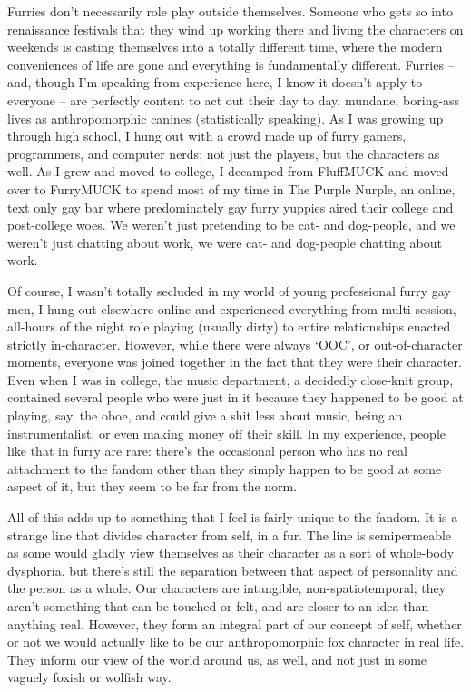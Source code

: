 Furries don't necessarily role play outside themselves.  Someone who gets so into renaissance festivals that they wind up working there and living the characters on weekends is casting themselves into a totally different time, where the modern conveniences of life are gone and everything is fundamentally different.  Furries -- and, though I'm speaking from experience here, I know it doesn't apply to everyone -- are perfectly content to act out their day to day, mundane, boring-ass lives as anthropomorphic canines (statistically speaking).  As I was growing up through high school, I hung out with a crowd made up of furry gamers, programmers, and computer nerds; not just the players, but the characters as well.  As I grew and moved to college, I decamped from FluffMUCK and moved over to FurryMUCK to spend most of my time in The Purple Nurple, an online, text only gay bar where predominately gay furry yuppies aired their college and post-college woes.  We weren't just pretending to be cat- and dog-people, and we weren't just chatting about work, we were cat- and dog-people chatting about work.

Of course, I wasn't totally secluded in my world of young professional furry gay men, I hung out elsewhere online and experienced everything from multi-session, all-hours of the night role playing (usually dirty) to entire relationships enacted strictly in-character.  However, while there were always `OOC', or out-of-character moments, everyone was joined together in the fact that they were their character.  Even when I was in college, the music department, a decidedly close-knit group, contained several people who were just in it because they happened to be good at playing, say, the oboe, and could give a shit less about music, being an instrumentalist, or even making money off their skill.  In my experience, people like that in furry are rare: there's the occasional person who has no real attachment to the fandom other than they simply happen to be good at some aspect of it, but they seem to be far from the norm.

All of this adds up to something that I feel is fairly unique to the fandom.  It is a strange line that divides character from self, in a fur.  The line is semipermeable as some would gladly view themselves as their character as a sort of whole-body dysphoria, but there's still the separation between that aspect of personality and the person as a whole.  Our characters are intangible, non-spatiotemporal; they aren't something that can be touched or felt, and are closer to an idea than anything real.  However, they form an integral part of our concept of self, whether or not we would actually like to be our anthropomorphic fox character in real life.  They inform our view of the world around us, as well, and not just in some vaguely foxish or wolfish way.

